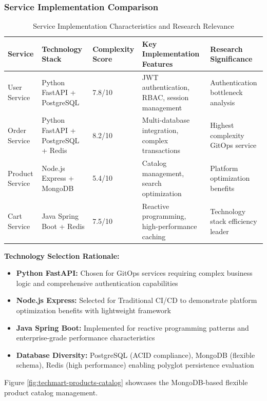 \subsubsection{Service Implementation Comparison}

\begin{table}[H]
\centering
\caption{Service Implementation Characteristics and Research Relevance}
\label{tab:service-implementation-comparison}
\begin{tabular}{|p{2.5cm}|p{3cm}|p{2cm}|p{3cm}|p{3.5cm}|}
\hline
\textbf{Service} & \textbf{Technology Stack} & \textbf{Complexity Score} & \textbf{Key Implementation Features} & \textbf{Research Significance} \\
\hline
User Service & Python FastAPI + PostgreSQL & 7.8/10 & JWT authentication, RBAC, session management & Authentication bottleneck analysis \\
\hline
Order Service & Python FastAPI + PostgreSQL + Redis & 8.2/10 & Multi-database integration, complex transactions & Highest complexity GitOps service \\
\hline
Product Service & Node.js Express + MongoDB & 5.4/10 & Catalog management, search optimization & Platform optimization benefits \\
\hline
Cart Service & Java Spring Boot + Redis & 7.5/10 & Reactive programming, high-performance caching & Technology stack efficiency leader \\
\hline
\end{tabular}
\end{table}

\textbf{Technology Selection Rationale:}
\begin{itemize}
\item \textbf{Python FastAPI:} Chosen for GitOps services requiring complex business logic and comprehensive authentication capabilities
\item \textbf{Node.js Express:} Selected for Traditional CI/CD to demonstrate platform optimization benefits with lightweight framework
\item \textbf{Java Spring Boot:} Implemented for reactive programming patterns and enterprise-grade performance characteristics
\item \textbf{Database Diversity:} PostgreSQL (ACID compliance), MongoDB (flexible schema), Redis (high performance) enabling polyglot persistence evaluation
\end{itemize}

Figure \ref{fig:techmart-products-catalog} showcases the MongoDB-based flexible product catalog management.

